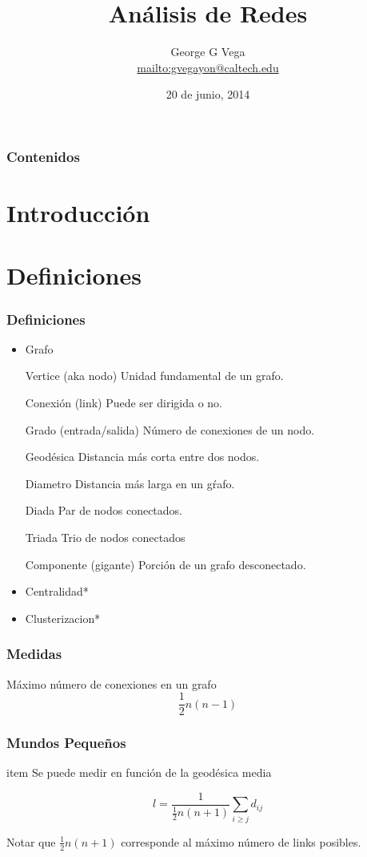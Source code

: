 \documentclass{beamer}
\author{George G Vega\\ \url{mailto:gvegayon@caltech.edu}}
\title{An\'alisis de Redes}
\date{20 de junio, 2014}
\begin{document}
\frame{\maketitle}

\begin{frame}
\frametitle{Contenidos}
\tableofcontents
\end{frame}

\section{Introducci\'on}

\section{Definiciones}

\begin{frame}
\frametitle{Definiciones}

\begin{itemize}
\item Grafo
\item[Vertice] (aka nodo) Unidad fundamental de un grafo.
\item[Conexi\'on] (link) Puede ser dirigida o no.
\item[Grado] (entrada/salida) N\'umero de conexiones de un nodo.
\item[Geod\'esica] Distancia m\'as corta entre dos nodos.
\item[Diametro] Distancia m\'as larga en un g\'rafo. 
\item[Diada] Par de nodos conectados.
\item[Triada] Trio de nodos conectados
\item[Componente] (gigante) Porci\'on de un grafo desconectado.
\item Centralidad*
\item Clusterizacion*
\end{itemize}
\end{frame}

\begin{frame}
\frametitle{Medidas}

M\'aximo n\'umero de conexiones en un grafo
\begin{equation}
\frac{1}{2}n(n-1)
\end{equation}
\end{frame}

\begin{frame}
\frametitle{Mundos Peque\~nos}
item Se puede medir en funci\'on de la geod\'esica media

\begin{equation}
l = \frac{1}{\frac{1}{2}n(n+1)}\sum_{i\geq j}{d_{ij}}
\end{equation}

Notar que $\frac{1}{2}n(n+1)$ corresponde al m\'aximo n\'umero de links
posibles.
\end{frame}
\end{document}
